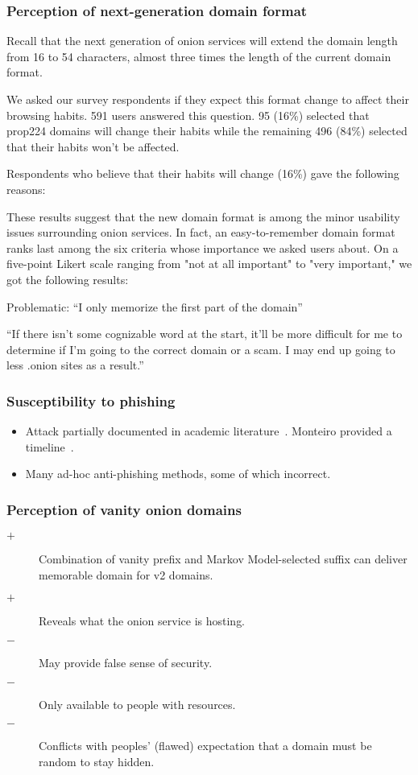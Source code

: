 \subsubsection{Perception of next-generation domain format}

Recall that the next generation of onion services will extend the domain length
from 16 to 54 characters, almost three times the length of the current domain
format.

We asked our survey respondents if they expect this format change to affect
their browsing habits.  591 users answered this question.  95 (16\%) selected
that prop224 domains will change their habits while the remaining 496 (84\%)
selected that their habits won't be affected.

Respondents who believe that their habits will change (16\%) gave the
following reasons:

These results suggest that the new domain format is among the
minor usability issues surrounding onion services.  In fact, an
easy-to-remember domain format ranks last among the six criteria whose
importance we asked users about.  On a five-point Likert scale ranging
from "not at all important" to "very important," we got the following
results:

Problematic:
``I only memorize the first part of the domain''

``If there isn't some cognizable word at the start, it'll be more difficult for
me to determine if I'm going to the correct domain or a scam. I may end up going
to less .onion sites as a result.''

\subsubsection{Susceptibility to phishing}
\begin{itemize}
    \item Attack partially documented in academic
        literature~\cite[\S~5.1]{Winter2016a}.  Monteiro provided a
        timeline~\cite{Monteiro2016a}.
    \item Many ad-hoc anti-phishing methods, some of which incorrect.
\end{itemize}

\subsubsection{Perception of vanity onion domains}
\begin{description}
    \item[$+$] Combination of vanity prefix and Markov Model-selected suffix can
        deliver memorable domain for v2 domains.
    \item[$+$] Reveals what the onion service is hosting.
    \item[$-$] May provide false sense of security.
    \item[$-$] Only available to people with resources.
    \item[$-$] Conflicts with peoples' (flawed) expectation that a domain must
        be random to stay hidden.
\end{description}

